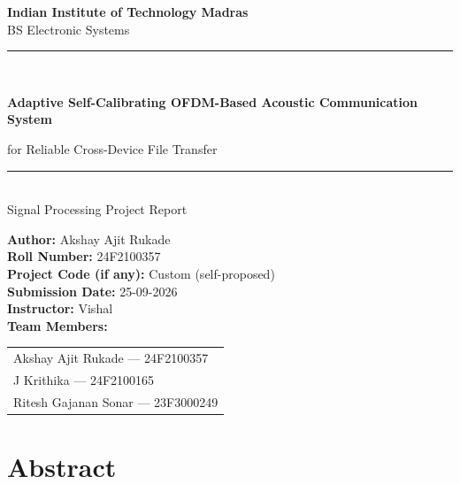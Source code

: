 \documentclass[11pt,a4paper]{report}
\begin{document}
\begin{titlepage}
    \centering
    \vspace*{1cm}

    {\Large \textbf{Indian Institute of Technology Madras}}\\[0.3cm]
    {\large BS Electronic Systems}\\[2cm]

    \rule{\linewidth}{0.5mm}\\[0.5cm]
    {\Huge \textbf{Adaptive Self-Calibrating OFDM-Based Acoustic Communication System}\par}
    \vspace{0.4cm}
    {\Large for Reliable Cross-Device File Transfer}\\
    \rule{\linewidth}{0.5mm}\\[2cm]

    {\large Signal Processing Project Report}\\[2cm]

    \begin{flushleft}
    \textbf{Author:} Akshay Ajit Rukade\\[0.3cm]
    \textbf{Roll Number:} 24F2100357\\[0.3cm]
    \textbf{Project Code (if any):} Custom (self-proposed)\\[0.3cm]
    \textbf{Submission Date:} 25-09-2026\\[0.3cm]
    \textbf{Instructor:} Vishal\\[0.3cm]
    \textbf{Team Members:} \begin{tabular}[t]{@{}l@{}}Akshay Ajit Rukade --- 24F2100357 \\ J Krithika --- 24F2100165 \\ Ritesh Gajanan Sonar --- 23F3000249\end{tabular}
    \end{flushleft}

    \vfill
\end{titlepage}

\tableofcontents
\newpage

\chapter*{Abstract}
\end{document}
